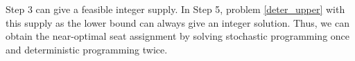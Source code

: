 \begin{remark}
  Step 3 can give a feasible integer supply. In Step 5, problem \eqref{deter_upper} with this supply as the lower bound can always give an integer solution.  
  Thus, we can obtain the near-optimal seat assignment by solving stochastic programming once and deterministic programming twice.
  
\end{remark}





